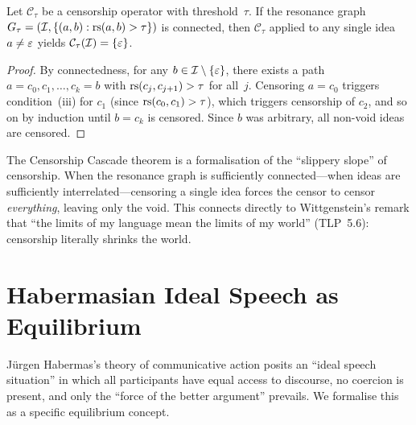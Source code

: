 \begin{theorem}
\label{thm:censorship-cascade}
Let $\mathcal{C}_\tau$ be a censorship operator with threshold~$\tau$.
If the resonance graph $G_\tau = (\mathcal{I}, \{(a,b) : \mathrm{rs}(a,b) > \tau\})$
is connected, then $\mathcal{C}_\tau$ applied to any single
idea~$a \ne \varepsilon$ yields $\mathcal{C}_\tau(\mathcal{I}) = \{\varepsilon\}$.
\end{theorem}

\begin{proof}
By connectedness, for any $b \in \mathcal{I} \setminus \{\varepsilon\}$, there
exists a path $a = c_0, c_1, \ldots, c_k = b$ with $\mathrm{rs}(c_j,c_{j+1})
> \tau$ for all~$j$.  Censoring $a = c_0$ triggers condition~(iii)
for $c_1$ (since $\mathrm{rs}(c_0,c_1) > \tau$), which triggers censorship
of $c_2$, and so on by induction until $b = c_k$ is censored.
Since $b$ was arbitrary, all non-void ideas are censored.
\end{proof}

\begin{interpretation}
The Censorship Cascade theorem is a formalisation of the ``slippery
slope'' of censorship.  When the resonance graph is sufficiently
connected---when ideas are sufficiently interrelated---censoring
a single idea forces the censor to censor \emph{everything},
leaving only the void.  This connects directly to Wittgenstein's
remark that ``the limits of my language mean the limits of my
world'' (TLP~5.6): censorship literally shrinks the world.
\end{interpretation}

\section{Habermasian Ideal Speech as Equilibrium}
\label{sec:habermas}

Jürgen Habermas's theory of communicative action posits an
``ideal speech situation'' in which all participants have equal
access to discourse, no coercion is present, and only the ``force
of the better argument'' prevails.  We formalise this as a
specific equilibrium concept.

